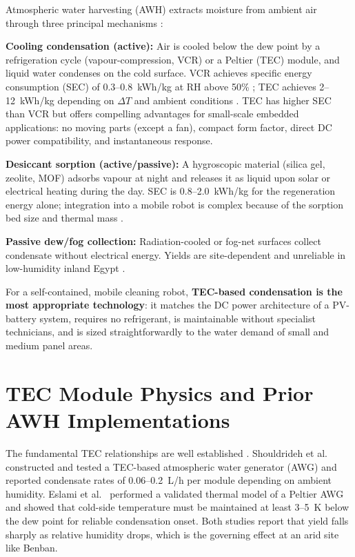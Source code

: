 \documentclass[12pt,a4paper]{report}   %
\begin{document}
Atmospheric water harvesting (AWH) extracts moisture from ambient air through three principal
mechanisms \cite{zhou2020review,feng2022review}:

\textbf{Cooling condensation (active):} Air is cooled below the dew point by a refrigeration
cycle (vapour-compression, VCR) or a Peltier (TEC) module, and liquid water condenses on the cold
surface. VCR achieves specific energy consumption (SEC) of 0.3--0.8~kWh/kg at RH above 50\%
\cite{bagheri2024sec}; TEC achieves 2--12~kWh/kg depending on $\Delta T$ and ambient conditions
\cite{eslami2021tec,shourideh2021tec}. TEC has higher SEC than VCR but offers compelling
advantages for small-scale embedded applications: no moving parts (except a fan), compact form
factor, direct DC power compatibility, and instantaneous response.

\textbf{Desiccant sorption (active/passive):} A hygroscopic material (silica gel, zeolite, MOF)
adsorbs vapour at night and releases it as liquid upon solar or electrical heating during the day.
SEC is 0.8--2.0~kWh/kg for the regeneration energy alone; integration into a mobile robot is
complex because of the sorption bed size and thermal mass \cite{kim2022lcow,zhou2020review}.

\textbf{Passive dew/fog collection:} Radiation-cooled or fog-net surfaces collect condensate
without electrical energy. Yields are site-dependent and unreliable in low-humidity inland Egypt
\cite{feng2022review}.

For a self-contained, mobile cleaning robot, \textbf{TEC-based condensation is the most
appropriate technology}: it matches the DC power architecture of a PV-battery system, requires
no refrigerant, is maintainable without specialist technicians, and is sized straightforwardly to
the water demand of small and medium panel areas.

\section{TEC Module Physics and Prior AWH Implementations}

The fundamental TEC relationships are well established \cite{riffat2003peltier,zhao2022teccondenser}.
Shouldrideh et al.\ \cite{shourideh2021tec} constructed and tested a TEC-based atmospheric water
generator (AWG) and reported condensate rates of 0.06--0.2~L/h per module depending on ambient
humidity. Eslami et al.\ \cite{eslami2021tec} performed a validated thermal model of a Peltier AWG
and showed that cold-side temperature must be maintained at least 3--5~K below the dew point for
reliable condensation onset. Both studies report that yield falls sharply as relative humidity
drops, which is the governing effect at an arid site like Benban.
\end{document}

